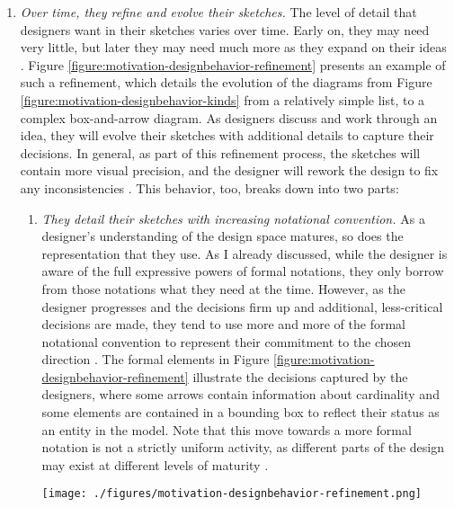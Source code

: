 \documentclass[12pt,fleqn]{ucithesis}
\begin{document}
\begin{enumerate}
\item \emph{Over time, they refine and evolve their sketches.} The level of detail that designers want in their sketches varies over time. Early on, they may need very little, but later they may need much more as they expand on their ideas \citep{ossher12flexible}. Figure \ref{figure:motivation-designbehavior-refinement} presents an example of such a refinement, which details the evolution of the diagrams from Figure \ref{figure:motivation-designbehavior-kinds} from a relatively simple list, to a complex box-and-arrow diagram. As designers discuss and work through an idea, they will evolve their sketches with additional details to capture their decisions. In general, as part of this refinement process, the sketches will contain more visual precision, and the designer will rework the design to fix any inconsistencies \citep{damm2000supporting}. This behavior, too, breaks down into two parts:
 \begin{enumerate}
 \item	\emph{They detail their sketches with increasing notational convention.} As a designer’s understanding of the design space matures, so does the representation that they use. As I already discussed, while the designer is aware of the full expressive powers of formal notations, they only borrow from those notations what they need at the time. However, as the designer progresses and the decisions firm up and additional, less-critical decisions are made, they tend to use more and more of the formal notational convention to represent their commitment to the chosen direction \citep{ossher2010flexible}. The formal elements in Figure \ref{figure:motivation-designbehavior-refinement} illustrate the decisions captured by the designers, where some arrows contain information about cardinality and some elements are contained in a bounding box to reflect their status as an entity in the model. Note that this move towards a more formal notation is not a strictly uniform activity, as different parts of the design may exist at different levels of maturity \citep{petre2009insights}.

\begin{figure*}[tbh]
  \centering
  \texttt{[image: ./figures/motivation-designbehavior-refinement.png]}
  \caption{Diagram from a design session that was refined from a list into a UML diagram.}
  \label{figure:motivation-designbehavior-refinement}
\end{figure*}  


\end{enumerate}
\end{enumerate}
\end{document}
